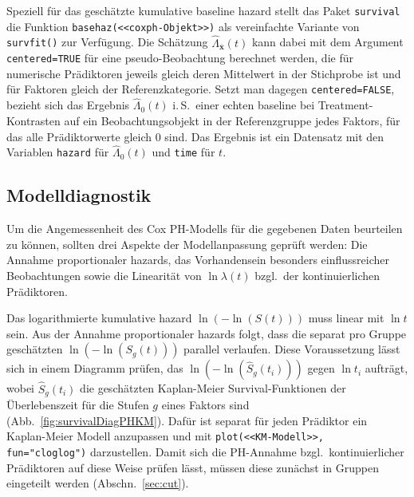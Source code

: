 Speziell für das geschätzte kumulative baseline hazard stellt das Paket \lstinline!survival! die Funktion \lstinline!basehaz(<<coxph-Objekt>>)! als vereinfachte Variante von \lstinline!survfit()! zur Verfügung. Die Schätzung $\hat{\Lambda}_{\overline{\bm{x}}}(t)$ kann dabei mit dem Argument \lstinline!centered=TRUE! für eine pseudo-Beobachtung berechnet werden, die für numerische Prädiktoren jeweils gleich deren Mittelwert in der Stichprobe ist und für Faktoren gleich der Referenzkategorie. Setzt man dagegen \lstinline!centered=FALSE!, bezieht sich das Ergebnis $\hat{\Lambda}_{0}(t)$ i.\,S.\ einer echten baseline bei Treatment-Kontrasten auf ein Beobachtungsobjekt in der Referenzgruppe jedes Faktors, für das alle Prädiktorwerte gleich $0$ sind. Das Ergebnis ist ein Datensatz mit den Variablen \lstinline!hazard! für $\hat{\Lambda}_{0}(t)$ und \lstinline!time! für $t$.

\subsection{Modelldiagnostik}

Um die Angemessenheit des Cox PH-Modells für die gegebenen Daten beurteilen zu können, sollten drei Aspekte der Modellanpassung geprüft werden: Die Annahme proportionaler hazards, das Vorhandensein besonders einflussreicher Beobachtungen sowie die Linearität von $\ln \lambda(t)$ bzgl.\ der kontinuierlichen Prädiktoren.

Das logarithmierte kumulative hazard $\ln(-\ln(S(t)))$ muss linear mit $\ln t$ sein. Aus der Annahme proportionaler hazards folgt, dass die separat pro Gruppe geschätzten $\ln(-\ln(S_{g}(t)))$ parallel verlaufen. Diese Voraussetzung lässt sich in einem Diagramm prüfen, das $\ln(-\ln(\hat{S}_{g}(t_{i})))$ gegen $\ln t_{i}$ aufträgt, wobei $\hat{S}_{g}(t_{i})$ die geschätzten Kaplan-Meier Survival-Funktionen der Überlebenszeit für die Stufen $g$ eines Faktors sind (Abb.\ \ref{fig:survivalDiagPHKM}). Dafür ist separat für jeden Prädiktor ein Kaplan-Meier Modell anzupassen und mit \lstinline!plot(<<KM-Modell>>, fun="cloglog")! darzustellen. Damit sich die PH-Annahme bzgl.\ kontinuierlicher Prädiktoren auf diese Weise prüfen lässt, müssen diese zunächst in Gruppen eingeteilt werden (Abschn.\ \ref{sec:cut}).

